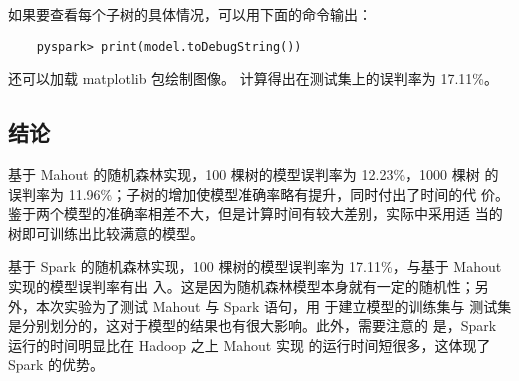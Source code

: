 如果要查看每个子树的具体情况，可以用下面的命令输出：

\begin{lstlisting}
	pyspark> print(model.toDebugString())
\end{lstlisting}

还可以加载 matplotlib 包绘制图像。 计算得出在测试集上的误判率为
17.11\%。

\subsection{结论}\label{ux7ed3ux8bba}

基于 Mahout 的随机森林实现，100 棵树的模型误判率为 12.23\%，1000 棵树
的误判率为 11.96\%；子树的增加使模型准确率略有提升，同时付出了时间的代
价。鉴于两个模型的准确率相差不大，但是计算时间有较大差别，实际中采用适
当的树即可训练出比较满意的模型。

基于 Spark 的随机森林实现，100 棵树的模型误判率为 17.11\%，与基于 Mahout
实现的模型误判率有出
入。这是因为随机森林模型本身就有一定的随机性；另外，本次实验为了测试
Mahout 与 Spark 语句，用 于建立模型的训练集与
测试集是分别划分的，这对于模型的结果也有很大影响。此外，需要注意的
是，Spark 运行的时间明显比在 Hadoop 之上 Mahout 实现
的运行时间短很多，这体现了 Spark 的优势。
